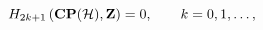 \begin{equation}
H_{2k+1}\left({\bf CP}({\cal H}), {\bf Z}\right)=0,\qquad k=0,1,\ldots,
\label{cotri}
\end{equation}

